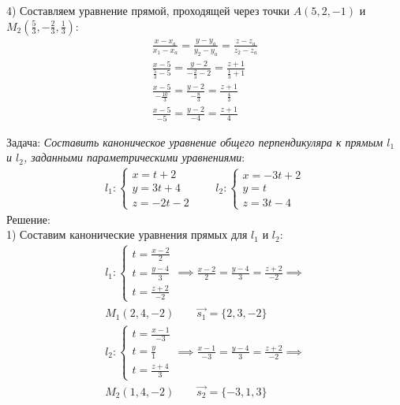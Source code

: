 \begin{eg}
  4) Составляем уравнение прямой, проходящей через точки $A\left(5, 2, -1\right)$ и $M_2\left(\frac{5}{3}, -\frac{2}{3}, \frac{1}{3}\right)$:
  \begin{gather*}
    \frac{x - x_a}{x_1 - x_a} = \frac{y - y_a}{y_2 - y_a} = \frac{z - z_a}{z_2 - z_a} \\
    \frac{x - 5}{\frac{5}{3} - 5} = \frac{y - 2}{-\frac{2}{3} - 2} = \frac{z + 1}{\frac{1}{3} + 1}  \\
    \frac{x - 5}{-\frac{10}{3}} = \frac{y - 2}{-\frac{8}{3}} = \frac{z + 1}{\frac{4}{3}} \\
    \boxed{\frac{x - 5}{-5} = \frac{y - 2}{-4} = \frac{z + 1}{4}}
  \end{gather*}
\end{eg}

\begin{eg}
  Задача: \textit{Составить каноническое уравнение общего перпендикуляра к прямым $l_1$ и $l_2$, заданными параметрическими уравнениями}:
  \begin{gather*}
    l_1: \begin{cases}
      x = t + 2 \\
      y = 3t + 4 \\
      z = -2t - 2
    \end{cases} \qquad
    l_2: \begin{cases}
      x = -3t + 2 \\
      y = t \\
      z = 3t - 4
    \end{cases}
  \end{gather*}
  Решение: \\
  1) Составим канонические уравнения прямых для $l_1$ и $l_2$:
  \begin{gather*}
    l_1: \begin{cases}
      t = \frac{x - 2}{2} \\
      t = \frac{y - 4}{3} \\
      t = \frac{z + 2}{-2}
    \end{cases} \implies
    \frac{x - 2}{2} = \frac{y - 4}{3} = \frac{z + 2}{-2} \implies \\
    M_1(2, 4, -2) \qquad \vec{s_1} = \{2, 3, -2\} 
  \end{gather*}
  \begin{gather*}
    l_2: \begin{cases}
      t = \frac{x - 1}{-3} \\
      t = \frac{y}{1} \\
      t = \frac{z + 4}{3}
    \end{cases} \implies
    \frac{x - 1}{-3} = \frac{y - 4}{3} = \frac{z + 2}{-2} \implies \\
    M_2(1, 4, -2) \qquad \vec{s_2} = \{-3, 1, 3\} 
  \end{gather*}


\end{eg}
